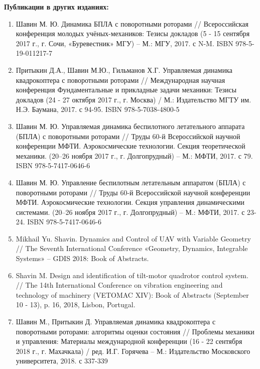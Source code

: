 \textbf{Публикации в других изданиях:}

\begin{enumerate}
	\item Шавин М. Ю. Динамика БПЛА с поворотными роторами // Всероссийская конференция молодых учёных-механиков: Тезисы докладов (5 - 15 сентября 2017 г., г. Сочи, «Буревестник» МГУ)  – М.: МГУ, 2017. с N-M. ISBN 978-5-19-011217-7
	
	\item Притыкин Д.А., Шавин М.Ю., Гильманов Х.Г. Управляемая динамика квадрокоптера с поворотными роторами // Международная научная конференция Фундаментальные и прикладные задачи механики: Тезисы докладов (24 - 27 октября 2017 г., г. Москва) / М.: Издательство МГТУ им. Н.Э. Баумана, 2017. с 94-95.
	ISBN 978-5-7038-4800-5
	
	\item Шавин М. Ю. Управляемая динамика беспилотного летательного аппарата (БПЛА) с поворотными роторами // Труды 60-й Всероссийской научной конференции МФТИ. Аэрокосмические технологии. Секция теоретической механики. (20–26 ноября 2017 г., г. Долгопрудный) -- М.: МФТИ, 2017. с 79. ISBN 978-5-7417-0646-6
	
	\item Шавин М. Ю. Управление беспилотным летательным аппаратом (БПЛА) с поворотными роторами // Труды 60-й Всероссийской научной конференции МФТИ. Аэрокосмические технологии. Секция управления динамическими системами. (20–26 ноября 2017 г., г. Долгопрудный) -- М.: МФТИ, 2017. с 23-24. ISBN 978-5-7417-0646-6
	
	\item Mikhail Yu. Shavin. Dynamics and Control of UAV with Variable Geometry // The Seventh International Conference «Geometry, Dynamics, Integrable Systems» – GDIS 2018: Book of Abstracts.
	
	\item Shavin M. Design and identification of tilt-motor quadrotor control system. // The 14th International Conference on vibration engineering and technology of machinery (VETOMAC XIV): Book of Abstracts (September 10 - 13), p. 16, 2018, Lisbon, Portugal.
	
	\item Шавин М., Притыкин Д. Управляемая динамика квадрокоптера с поворотными роторами: алгоритмы оценки состояния // Проблемы механики и управления: Материалы международной конференции (16 - 22 сентября 2018 г., г. Махачкала) / ред. И.Г. Горячева – М.: Издательство Московского университета, 2018. с 337-339
	
\end{enumerate}
